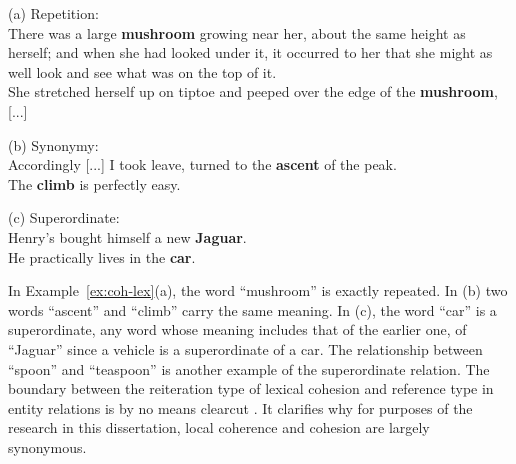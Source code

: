 \begin{examples}
    \label{ex:coh-lex}
    (a) Repetition: \\
    There was a large \textbf{mushroom} growing near her, about the same height as herself; and when she had looked under it, it occurred to her that she might as well look and see what was on the top of it.\\
    She stretched herself up on tiptoe and peeped over the edge of the \textbf{mushroom}, [...] 

    (b) Synonymy: \\
    Accordingly [...] I took leave, turned to the \textbf{ascent} of the peak. \\
    The \textbf{climb} is perfectly easy. 

    (c) Superordinate: \\
    Henry's bought himself a new \textbf{Jaguar}. \\
    He practically lives in the \textbf{car}. 

\end{examples} 

In Example~\ref{ex:coh-lex}(a), the word ``mushroom'' is exactly repeated. 
In (b) two words ``ascent'' and ``climb'' carry the same meaning. 
In (c), the word ``car'' is a superordinate, any word whose meaning includes that of the earlier one, of ``Jaguar'' since a vehicle is a superordinate of a car. 
The relationship between ``spoon'' and ``teaspoon'' is another example of the superordinate relation. 
The boundary between the reiteration type of lexical cohesion and reference type in entity relations is by no means clearcut \cite{halliday76}. 
It clarifies why for purposes of the research in this dissertation, local coherence and cohesion are largely synonymous. 



